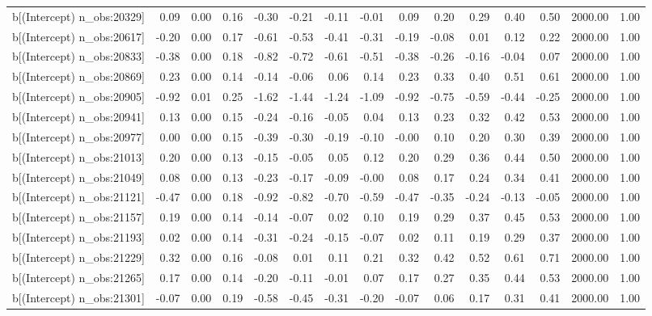 \begin{table}[ht]
\begin{tabular}{rrrrrrrrrrrrrrr}
  b[(Intercept) n\_obs:20329] & 0.09 & 0.00 & 0.16 & -0.30 & -0.21 & -0.11 & -0.01 & 0.09 & 0.20 & 0.29 & 0.40 & 0.50 & 2000.00 & 1.00 \\ 
  b[(Intercept) n\_obs:20617] & -0.20 & 0.00 & 0.17 & -0.61 & -0.53 & -0.41 & -0.31 & -0.19 & -0.08 & 0.01 & 0.12 & 0.22 & 2000.00 & 1.00 \\ 
  b[(Intercept) n\_obs:20833] & -0.38 & 0.00 & 0.18 & -0.82 & -0.72 & -0.61 & -0.51 & -0.38 & -0.26 & -0.16 & -0.04 & 0.07 & 2000.00 & 1.00 \\ 
  b[(Intercept) n\_obs:20869] & 0.23 & 0.00 & 0.14 & -0.14 & -0.06 & 0.06 & 0.14 & 0.23 & 0.33 & 0.40 & 0.51 & 0.61 & 2000.00 & 1.00 \\ 
  b[(Intercept) n\_obs:20905] & -0.92 & 0.01 & 0.25 & -1.62 & -1.44 & -1.24 & -1.09 & -0.92 & -0.75 & -0.59 & -0.44 & -0.25 & 2000.00 & 1.00 \\ 
  b[(Intercept) n\_obs:20941] & 0.13 & 0.00 & 0.15 & -0.24 & -0.16 & -0.05 & 0.04 & 0.13 & 0.23 & 0.32 & 0.42 & 0.53 & 2000.00 & 1.00 \\ 
  b[(Intercept) n\_obs:20977] & 0.00 & 0.00 & 0.15 & -0.39 & -0.30 & -0.19 & -0.10 & -0.00 & 0.10 & 0.20 & 0.30 & 0.39 & 2000.00 & 1.00 \\ 
  b[(Intercept) n\_obs:21013] & 0.20 & 0.00 & 0.13 & -0.15 & -0.05 & 0.05 & 0.12 & 0.20 & 0.29 & 0.36 & 0.44 & 0.50 & 2000.00 & 1.00 \\ 
  b[(Intercept) n\_obs:21049] & 0.08 & 0.00 & 0.13 & -0.23 & -0.17 & -0.09 & -0.00 & 0.08 & 0.17 & 0.24 & 0.34 & 0.41 & 2000.00 & 1.00 \\ 
  b[(Intercept) n\_obs:21121] & -0.47 & 0.00 & 0.18 & -0.92 & -0.82 & -0.70 & -0.59 & -0.47 & -0.35 & -0.24 & -0.13 & -0.05 & 2000.00 & 1.00 \\ 
  b[(Intercept) n\_obs:21157] & 0.19 & 0.00 & 0.14 & -0.14 & -0.07 & 0.02 & 0.10 & 0.19 & 0.29 & 0.37 & 0.45 & 0.53 & 2000.00 & 1.00 \\ 
  b[(Intercept) n\_obs:21193] & 0.02 & 0.00 & 0.14 & -0.31 & -0.24 & -0.15 & -0.07 & 0.02 & 0.11 & 0.19 & 0.29 & 0.37 & 2000.00 & 1.00 \\ 
  b[(Intercept) n\_obs:21229] & 0.32 & 0.00 & 0.16 & -0.08 & 0.01 & 0.11 & 0.21 & 0.32 & 0.42 & 0.52 & 0.61 & 0.71 & 2000.00 & 1.00 \\ 
  b[(Intercept) n\_obs:21265] & 0.17 & 0.00 & 0.14 & -0.20 & -0.11 & -0.01 & 0.07 & 0.17 & 0.27 & 0.35 & 0.44 & 0.53 & 2000.00 & 1.00 \\ 
  b[(Intercept) n\_obs:21301] & -0.07 & 0.00 & 0.19 & -0.58 & -0.45 & -0.31 & -0.20 & -0.07 & 0.06 & 0.17 & 0.31 & 0.41 & 2000.00 & 1.00 \\ 

\end{tabular}
\end{table}
